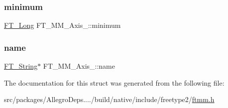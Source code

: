 \subsubsection{\texorpdfstring{minimum}{minimum}}
{\footnotesize\ttfamily \hyperlink{fttypes_8h_a7fa72a1f0e79fb1860c5965789024d6f}{F\+T\+\_\+\+Long} F\+T\+\_\+\+M\+M\+\_\+\+Axis\+\_\+\+::minimum}

\mbox{\label{struct_f_t___m_m___axis___a5c784efa44906c0e2b715eb1f866a09f}} 
\subsubsection{\texorpdfstring{name}{name}}
{\footnotesize\ttfamily \hyperlink{fttypes_8h_a9846214585359eb2ba6bbb0e6de30639}{F\+T\+\_\+\+String}$\ast$ F\+T\+\_\+\+M\+M\+\_\+\+Axis\+\_\+\+::name}



The documentation for this struct was generated from the following file\+:\begin{DoxyCompactItemize}
\item 
src/packages/\+Allegro\+Deps..../build/native/include/freetype2/\hyperlink{ftmm_8h}{ftmm.\+h}\end{DoxyCompactItemize}

